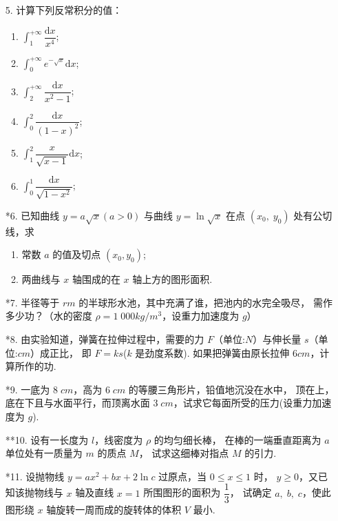\begin{enumerate}
    \item[5.] 计算下列反常积分的值：
    \begin{enumerate}[(1)]\setlength{\itemsep}{5pt}\setlength{\topsep}{15pt}
        \item $\displaystyle \int_{1}^{+\infty}\dfrac{\text{d}x}{x^4}$;
        \item $\displaystyle \int_0^{+\infty}e^{-\sqrt{x}}\text{d}x$;
        \item $\displaystyle \int_2^{+\infty}\dfrac{\text{d}x}{x^2-1}$;
        \item $\displaystyle \int_0^2\dfrac{\text{d}x}{(1-x)^2}$;
        \item $\displaystyle \int_1^2\dfrac{x}{\sqrt{x-1}}\text{d}x$;
        \item $\displaystyle \int_0^1\dfrac{\text{d}x}{\sqrt{1-x^2}}$;
    \end{enumerate}

    \item[*6.] 已知曲线 $y=a\sqrt{x}(a>0)$ 与曲线 $y=\ln\sqrt{x}$ 
    在点 $(x_0,\;y_0)$ 处有公切线，求
    \begin{enumerate}[(1)]\setlength{\itemsep}{5pt}\setlength{\topsep}{15pt}
        \item 常数 $a$ 的值及切点 $(x_0,y_0)$;
        \item 两曲线与 $x$ 轴围成的在 $x$ 轴上方的图形面积.
    \end{enumerate}

    \item[*7.] 半径等于 $r m$ 的半球形水池，其中充满了谁，把池内的水完全吸尽，
    需作多少功？（水的密度 $\rho=1\;000kg/m^3$，设重力加速度为 $g$）

    \item[*8.] 由实验知道，弹簧在拉伸过程中，需要的力 $F$（单位:$N$）与伸长量 $s$（单位:$cm$）成正比，
    即 $F=ks$($k$ 是劲度系数). 如果把弹簧由原长拉伸 $6cm$，计算所作的功.

    \item[*9.] 一底为 $8\;cm$，高为 $6\;cm$ 的等腰三角形片，铅值地沉没在水中，
    顶在上，底在下且与水面平行，而顶离水面 $3\;cm$，试求它每面所受的压力(设重力加速度为 $g$).

    \item[**10.] 设有一长度为 $l$，线密度为 $\rho$ 的均匀细长棒，
    在棒的一端垂直距离为 $a$ 单位处有一质量为 $m$ 的质点 $M$，
    试求这细棒对指点 $M$ 的引力.

    \item[*11.] 设抛物线 $y=ax^2+bx+2\ln c$ 过原点，当 $0\leqslant x\leqslant 1$ 时，
    $y\geqslant 0$，又已知该抛物线与 $x$ 轴及直线 $x=1$ 所围图形的面积为 $\dfrac{1}{3}$，
    试确定 $a,\;b,\;c$，使此图形绕 $x$ 轴旋转一周而成的旋转体的体积 $V$ 最小.


\end{enumerate}
